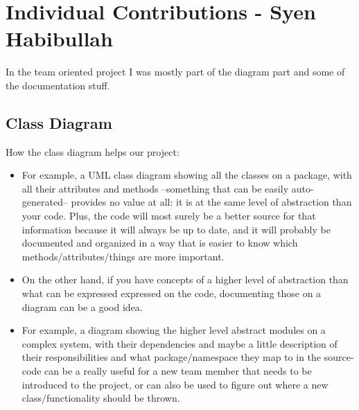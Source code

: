 \documentclass[12pt, a4paper]{article}
\begin{document}
\newpage



\section{Individual Contributions - Syen Habibullah}
In the team oriented project I was mostly part of the diagram part and  some of the documentation stuff.

\subsection{Class Diagram}
How the class diagram helps our project:
\begin{itemize}
\item For example, a UML class diagram showing all the classes on a package, with all their attributes and methods --something that can be easily auto-generated-- provides no value at all: it is at the same level of abstraction than your code. Plus, the code will most surely be a better source for that information because it will always be up to date, and it will probably be documented and organized in a way that is easier to know which methods/attributes/things are more important.
\item On the other hand, if you have concepts of a higher level of abstraction than what can be expressed expressed on the code, documenting those on a diagram can be a good idea. 
\item For example, a diagram showing the higher level abstract modules on a complex system, with their dependencies and maybe a little description of their responsibilities and what package/namespace they map to in the source-code can be a really useful for a new team member that needs to be introduced to the project, or can also be used to figure out where a new class/functionality should be thrown.
\end{itemize}
\end{document}
